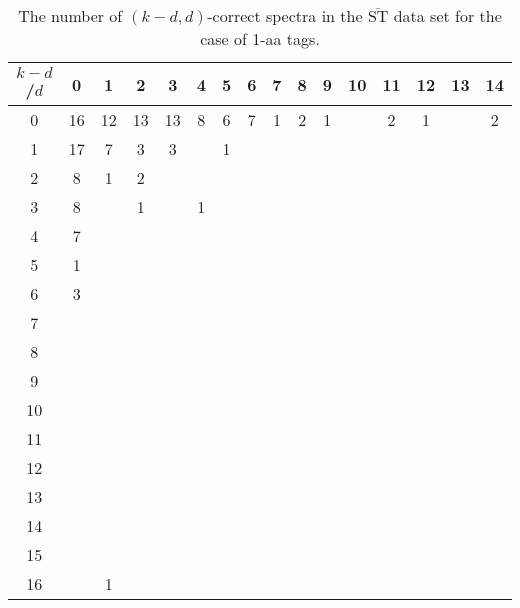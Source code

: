 \documentclass{article}[12pt]
\def\STbar{{\overline{\mathrm{ST}}}}
\begin{document}
\begin{landscape}

\begin{table}[h]\footnotesize
{\centering
\begin{tabular}{|c|c|
c|c|c|c|c|c|c|c|c|c|c|c|c|c|}
  \hline
  $k-d$/$d$ 
 & 0 & 1 & 2 & 3 & 4 & 5 & 6 & 7 & 8 & 9 & 10 & 11 & 12 & 13 & 14\\

  \hline
  \hline

0  & 16 & 12 & 13 & 13 & 8 & 6 & 7 & 1 & 2 & 1 &  & 2 & 1 &  & 2\\

1  & 17 & 7 & 3 & 3 &  & 1 &  &  &  &  &  &  &  &  & \\

2  & 8 & 1 & 2 &  &  &  &  &  &  &  &  &  &  &  & \\

3  & 8 &  & 1 &  & 1 &  &  &  &  &  &  &  &  &  & \\

4  & 7 &  &  &  &  &  &  &  &  &  &  &  &  &  & \\

5  & 1 &  &  &  &  &  &  &  &  &  &  &  &  &  & \\

6  & 3 &  &  &  &  &  &  &  &  &  &  &  &  &  & \\

7  &  &  &  &  &  &  &  &  &  &  &  &  &  &  & \\

8  &  &  &  &  &  &  &  &  &  &  &  &  &  &  & \\

9  &  &  &  &  &  &  &  &  &  &  &  &  &  &  & \\

10  &  &  &  &  &  &  &  &  &  &  &  &  &  &  & \\

11  &  &  &  &  &  &  &  &  &  &  &  &  &  &  & \\

12  &  &  &  &  &  &  &  &  &  &  &  &  &  &  & \\

13  &  &  &  &  &  &  &  &  &  &  &  &  &  &  & \\

14  &  &  &  &  &  &  &  &  &  &  &  &  &  &  & \\

15  &  &  &  &  &  &  &  &  &  &  &  &  &  &  & \\

16  &  & 1 &  &  &  &  &  &  &  &  &  &  &  &  & \\

  \hline
\end{tabular}
\par}
\centering
\caption{The number of $(k-d,d)$-correct spectra in the $\STbar$ data set for the case of 1-aa tags.}
\vspace{3mm}
\label{table:kd-1-correct-ST-bar}
\end{table}
\end{landscape}
\end{document}
